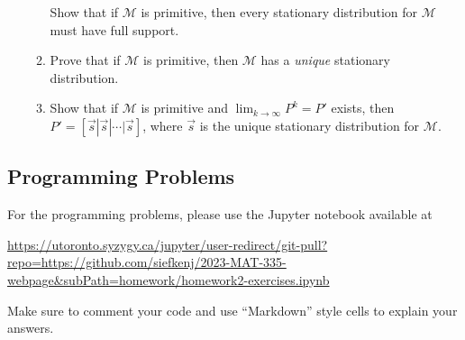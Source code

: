 \documentclass[letter]{article}
\begin{document}
\begin{enumerate}
\begin{enumerate}
				\smallskip
				Show that if $\mathcal M$ is primitive, then every stationary distribution for $\mathcal M$
				must have full support.
			\item Prove that if $\mathcal M$ is primitive, then $\mathcal M$ has a \emph{unique} stationary distribution.
			\item Show that if $\mathcal M$ is primitive and $\lim_{k\to\infty} P^k=P'$ exists, then $P'=[\vec s|\vec s|\cdots|\vec s]$,
				where $\vec s$ is the unique stationary distribution for $\mathcal M$.
		\end{enumerate}


	\end{enumerate}


	\subsection*{Programming Problems}
	For the programming problems, please use the Jupyter notebook available at

	\url{https://utoronto.syzygy.ca/jupyter/user-redirect/git-pull?repo=https://github.com/siefkenj/2023-MAT-335-webpage&subPath=homework/homework2-exercises.ipynb}

	Make sure to comment your code and use ``Markdown'' style cells to explain your answers.
\end{document}
